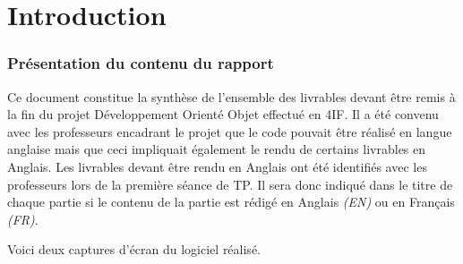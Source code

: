 \documentclass[paper=a4, fontsize=11pt]{report}
\numberwithin{equation}{section}		%
\numberwithin{figure}{section}		%
\numberwithin{table}{section}		%
\renewcommand{\it}[1]{\textit{#1}}
\begin{document}


\tableofcontents

\listoftodos

\newpage

\part{Introduction}
\label{part:introduction}
\setcounter{section}{0}

\section{Présentation du contenu du rapport}
\label{sec:presentation-du-contenu-du-rapport}

Ce document constitue la synthèse de l'ensemble des livrables devant être remis à la fin du projet Développement Orienté Objet effectué en 4IF. Il a été convenu avec les professeurs encadrant le projet que le code pouvait être réalisé en langue anglaise mais que ceci impliquait également le rendu de certains livrables en Anglais. Les livrables devant être rendu en Anglais ont été identifiés avec les professeurs lors de la première séance de TP. Il sera donc indiqué dans le titre de chaque partie si le contenu de la partie est rédigé en Anglais \it{(EN)} ou en Français \it{(FR)}.  

\newpage

Voici deux captures d'écran du logiciel réalisé.
\end{document}
